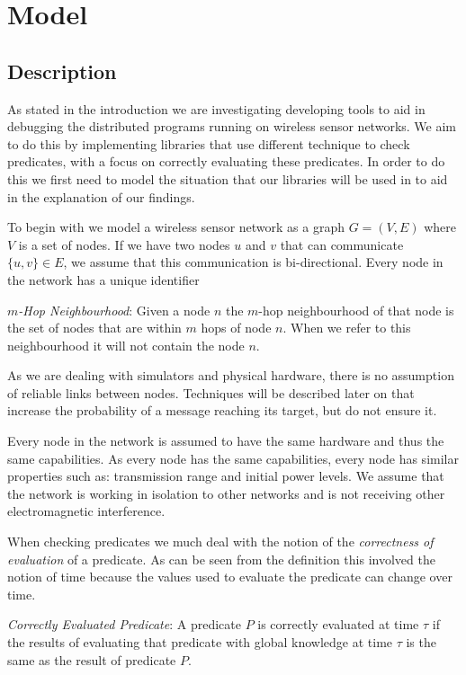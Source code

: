 \section{Model}

\subsection{Description}

As stated in the introduction we are investigating developing tools to aid in debugging the distributed programs running on wireless sensor networks. We aim to do this by implementing libraries that use different technique to check predicates, with a focus on correctly evaluating these predicates. In order to do this we first need to model the situation that our libraries will be used in to aid in the explanation of our findings.

To begin with we model a wireless sensor network as a graph $G = (V, E)$ where $V$ is a set of nodes. If we have two nodes $u$ and $v$ that can communicate $\{u, v\} \in E$, we assume that this communication is bi-directional. Every node in the network has a unique identifier 

\begin{mydef}
\emph{$m$-Hop Neighbourhood}: Given a node $n$ the $m$-hop neighbourhood of that node is the set of nodes that are within $m$ hops of node $n$. When we refer to this neighbourhood it will not contain the node $n$.
\end{mydef}

As we are dealing with simulators and physical hardware, there is no assumption of reliable links between nodes. Techniques will be described later on that increase the probability of a message reaching its target, but do not ensure it.

Every node in the network is assumed to have the same hardware and thus the same capabilities. As every node has the same capabilities, every node has similar properties such as: transmission range and initial power levels. We assume that the network is working in isolation to other networks and is not receiving other electromagnetic interference.

When checking predicates we much deal with the notion of the \emph{correctness of evaluation} of a predicate. As can be seen from the definition this involved the notion of time because the values used to evaluate the predicate can change over time.

\begin{mydef}
\emph{Correctly Evaluated Predicate}: A predicate $P$ is correctly evaluated at time $\tau$ if the results of evaluating that predicate with global knowledge at time $\tau$ is the same as the result of predicate $P$.
\end{mydef}

